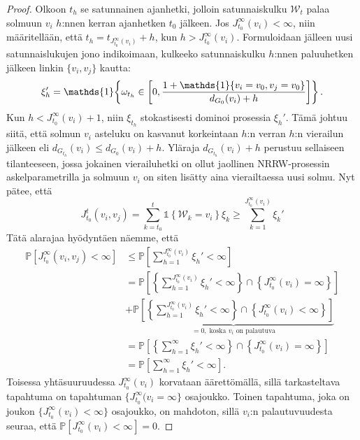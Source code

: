 \documentclass[finnish, 12pt, a4paper, sci, utf8, pdfa]{aaltothesis}
\newcommand{\Wrandom}{\mathcal{W}}
\newcommand{\indicator}{\mathopen{\mathds{1}}}
\newcommand*{\prob}{\mathbb{P}}
\begin{document}
\begin{proof}
   Olkoon $ t_{h} $ se satunnainen ajanhetki, jolloin satunnaiskulku $ \Wrandom_{t} $ palaa solmuun $ v_{i} $ $ h $:nnen kerran ajanhetken $ t_{0} $ jälkeen. Jos $ J_{t_{0}}^{\infty}(v_{i}) < \infty $,
   niin määritellään, että $ t_{h} = t_{J_{t_{0}}^{\infty}(v_{i})} + h $, kun $ h > J_{t_{0}}^{\infty}(v_{i}) $. Formuloidaan jälleen uusi satunnaislukujen jono indikoimaan, kulkeeko 
   satunnaiskulku $ h $:nnen paluuhetken jälkeen linkin $ \{ v_{i}, v_{j} \} $ kautta:
   \begin{equation*}
      \setlength{\jot}{10pt}
      \begin{aligned}
      \xi_{h}' = \indicator \left\{ \omega_{t_{h}} \in \left[ 0, \frac{1 + \indicator \{ v_{i} = v_{0}, v_{j} = v_{0} \}}{d_{G_{0}}(v_{i}) + h} \right] \right\}.
      \end{aligned}
   \end{equation*}
   Kun $ h < J_{t_{0}}^{\infty}(v_{i}) + 1 $, niin $ \xi_{t_{h}} $ stokastisesti dominoi prosessia $ \xi_{h}' $. 
   Tämä johtuu siitä, että solmun $ v_{i} $ asteluku on kasvanut korkeintaan $ h $:n verran $ h $:n vierailun jälkeen eli $ d_{G_{t_{h}}}(v_{i}) \leq d_{G_{0}}(v_{i}) + h $. Yläraja
   $ d_{G_{t_{h}}}(v_{i}) + h $ perustuu sellaiseen tilanteeseen, jossa jokainen vierailuhetki on ollut jaollinen NRRW-prosessin askelparametrilla ja solmuun $ v_{i} $ on siten lisätty
   aina vierailtaessa uusi solmu. Nyt pätee, että
   \[
      J_{t_{0}}^{t}(v_{i}, v_{j}) = \sum_{k = t_{0}}^{t} \indicator \left\{ \Wrandom_{k} = v_{i} \right\} \xi_{k} \geq \sum_{k = 1}^{J_{t_{0}}^{\infty}(v_{i})} \xi_{k}'
   \]
   Tätä alarajaa hyödyntäen näemme, että
   \begin{align*}
      \prob \left[ J_{t_{0}}^{\infty}(v_{i}, v_{j}) < \infty \right] &\leq \prob \left[ \sum_{h = 1}^{J_{t_{0}}^{\infty}(v_{i})} \xi_{h}' < \infty \right] \\
         &= \prob \left[ \left\{ \sum_{h = 1}^{J_{t_{0}}^{\infty}(v_{i})} \xi_{h}' < \infty \right\} \cap \left\{ J_{t_{0}}^{\infty}(v_{i}) = \infty \right\} \right] \\
         &+ \underbrace{\prob \left[ \left\{ \sum_{h = 1}^{J_{t_{0}}^{\infty}(v_{i})} \xi_{h}' < \infty \right\} \cap \left\{ J_{t_{0}}^{\infty}(v_{i}) < \infty \right\} \right]}_{= 0, \; \text{koska } v_{i} \text{ on palautuva}} \\
         &= \prob \left[ \left\{ \sum_{h = 1}^{\infty} \xi_{h}' < \infty \right\} \cap \left\{ J_{t_{0}}^{\infty}(v_{i}) = \infty \right\} \right] \\
         &= \prob \left[ \sum_{h = 1}^{\infty} \xi_{h}' < \infty \right].
   \end{align*}
   Toisessa yhtäsuuruudessa $ J_{t_{0}}^{\infty}(v_{i}) $ korvataan äärettömällä, sillä tarkasteltava tapahtuma on tapahtuman $ \{ J_{t_{0}}^{\infty}(v_{i} = \infty \} $ osajoukko. 
   Toinen tapahtuma, joka on joukon $ \{ J_{t_{0}}^{\infty}(v_{i}) < \infty \} $ osajoukko, on mahdoton, sillä $ v_{i} $:n palautuvuudesta seuraa, että $ \prob \left[ J_{t_{0}}^{\infty}(v_{i}) < \infty \right] = 0 $.


\end{proof}
\end{document}
